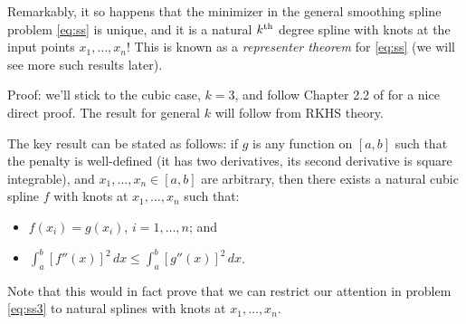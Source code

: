 \documentclass{article}
\begin{document}
Remarkably, it so happens that the minimizer in the general smoothing spline
problem \eqref{eq:ss} is unique, and it is a natural $k^{\text{th}}$ degree spline with 
knots at the input points $x_1,\dots,x_n$! This is known as a \emph{representer
  theorem} for \eqref{eq:ss} (we will see more such results later). 

Proof: we'll stick to the cubic case, $k=3$, and follow Chapter 2.2 of
\citet{green1993nonparametric} for a nice direct proof. The result for general
$k$ will follow from RKHS theory.  

The key result can be stated as follows: if $g$ is any function on $[a,b]$ such
that the penalty is well-defined (it has two derivatives, its second derivative
is square integrable), and $x_1,\dots,x_n \in [a,b]$ are arbitrary, then there
exists a natural cubic spline $f$ with knots at $x_1,\dots,x_n$ such that: 
\begin{itemize}
\item $f(x_i) = g(x_i)$, $i=1,\dots,n$; and 
\item $\int_a^b [f''(x)]^2 \, dx \leq \int_a^b [g''(x)]^2 \, dx$.
\end{itemize}
Note that this would in fact prove that we can restrict our attention in problem 
\eqref{eq:ss3} to natural splines with knots at $x_1,\dots,x_n$.
\end{document}
